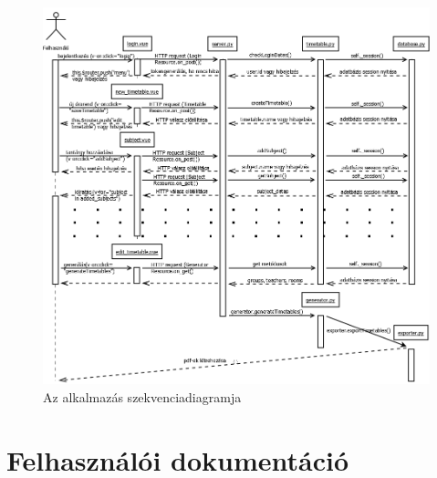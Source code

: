 \documentclass[12pt,a4paper]{report}
\begin{document}
\begin{figure}
\includegraphics[width=\linewidth]{images/szekvencia.png}
\caption{Az alkalmazás szekvenciadiagramja}
\end{figure}

\section{Felhasználói dokumentáció}
\end{document}
